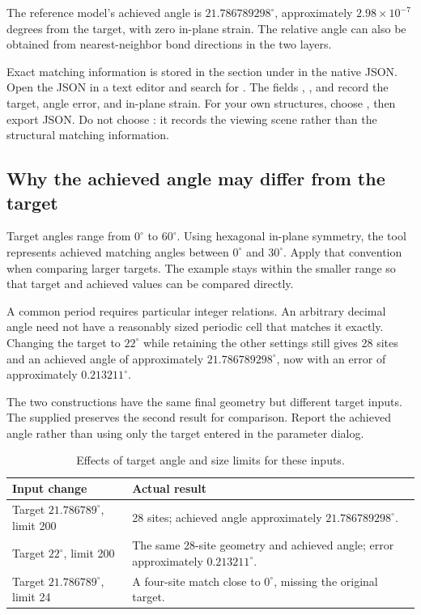 The reference model's achieved angle is $21.786789298^\circ$, approximately $2.98\times10^{-7}$ degrees from the target, with zero in-plane strain. The relative angle can also be obtained from nearest-neighbor bond directions in the two layers.

Exact matching information is stored in the  section under  in the native JSON. Open the JSON in a text editor and search for . The fields , , and  record the target, angle error, and in-plane strain. For your own structures, choose , then export JSON. Do not choose : it records the viewing scene rather than the structural matching information.

\subsection{Why the achieved angle may differ from the target}

Target angles range from $0^\circ$ to $60^\circ$. Using hexagonal in-plane symmetry, the tool represents achieved matching angles between $0^\circ$ and $30^\circ$. Apply that convention when comparing larger targets. The example stays within the smaller range so that target and achieved values can be compared directly.

A common period requires particular integer relations. An arbitrary decimal angle need not have a reasonably sized periodic cell that matches it exactly. Changing the target to $22^\circ$ while retaining the other settings still gives 28 sites and an achieved angle of approximately $21.786789298^\circ$, now with an error of approximately $0.213211^\circ$.

The two constructions have the same final geometry but different target inputs. The supplied  preserves the second result for comparison. Report the achieved angle rather than using only the target entered in the parameter dialog.

\begin{table}[htbp]
\centering
\caption{Effects of target angle and size limits for these inputs.}
\begin{tabularx}{\linewidth}{lX}
\toprule
Input change & Actual result\\
\midrule
Target $21.786789^\circ$, limit 200 & 28 sites; achieved angle approximately $21.786789298^\circ$.\\
Target $22^\circ$, limit 200 & The same 28-site geometry and achieved angle; error approximately $0.213211^\circ$.\\
Target $21.786789^\circ$, limit 24 & A four-site match close to $0^\circ$, missing the original target.\\
\bottomrule
\end{tabularx}
\end{table}

